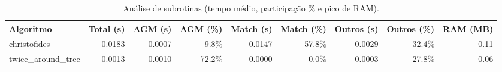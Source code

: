\begin{table}[htbp]
\centering
\caption{Análise de subrotinas (tempo médio, participação \% e pico de RAM).}
\label{tab:subrotinas_tsp}
\begin{tabular}{lrrrrrrrr}
\hline
Algoritmo & Total (s) & AGM (s) & AGM (\%) & Match (s) & Match (\%) & Outros (s) & Outros (\%) & RAM (MB) \\
\hline
christofides & 0.0183 & 0.0007 & 9.8\% & 0.0147 & 57.8\% & 0.0029 & 32.4\% & 0.11 \\
twice\_around\_tree & 0.0013 & 0.0010 & 72.2\% & 0.0000 & 0.0\% & 0.0003 & 27.8\% & 0.06 \\
\hline
\end{tabular}
\end{table}

